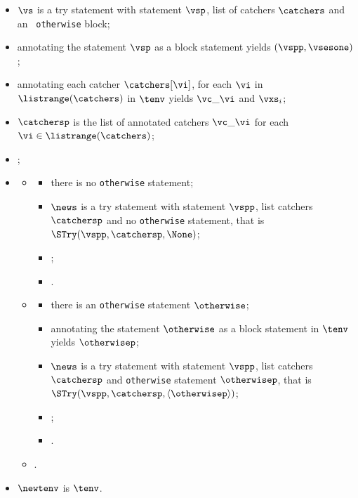 \ProseParagraph
\AllApply
\begin{itemize}
  \item $\vs$ is a try statement with statement $\vsp$, list of catchers $\catchers$ and an \optional\ \texttt{otherwise} block;
  \item annotating the statement $\vsp$ as a block statement yields $(\vspp, \vsesone)$\ProseOrTypeError;
  \item annotating each catcher $\catchers[\vi]$, for each $\vi$ in $\listrange(\catchers)$ in $\tenv$ yields $\vc\_\vi$
        and $\vxs_i$\ProseOrTypeError;
  \item $\catchersp$ is the list of annotated catchers $\vc\_\vi$ for each $\vi\in\listrange(\catchers)$;
  \item {};
  \item \OneApplies
  \begin{itemize}
    \item {}
    \begin{itemize}
      \item there is no \texttt{otherwise} statement;
      \item $\news$ is a try statement with statement $\vspp$, list catchers $\catchersp$ and no \texttt{otherwise} statement,
            that is \\
            $\STry(\vspp, \catchersp, \None)$;
      \item {};
      \item \Proseeqdef{$\vsesthree$}{$\vsestwo$}.
    \end{itemize}

    \item {}
    \begin{itemize}
      \item there is an \texttt{otherwise} statement $\otherwise$;
      \item annotating the statement $\otherwise$ as a block statement in $\tenv$ yields $\otherwisep$\ProseOrTypeError;
      \item $\news$ is a try statement with statement $\vspp$, list catchers $\catchersp$ and \texttt{otherwise} statement
            $\otherwisep$, that is \\
            $\STry(\vspp, \catchersp, \langle\otherwisep\rangle)$;
      \item \Proseeqdef{$\vsesotherwise$}{$\vsesblock$};
      \item \Proseeqdef{$\vsesthree$}{$\vsestwo$}.
    \end{itemize}

    \item {}.
  \end{itemize}
  \item $\newtenv$ is $\tenv$.
\end{itemize}

